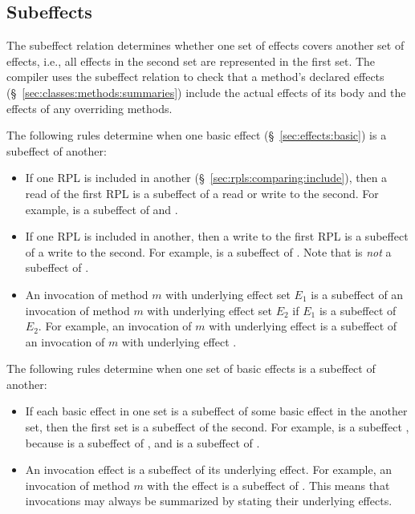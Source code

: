 \subsection{Subeffects%
\label{sec:effects:subeffects}}

The subeffect relation determines whether one set of effects covers
another set of effects, i.e., all effects in the second set are
represented in the first set.  The compiler uses the subeffect
relation to check that a method's declared effects
(\S~\ref{sec:classes:methods:summaries}) include the actual effects of
its body and the effects of any overriding methods.

  The following rules determine when one basic
effect (\S~\ref{sec:effects:basic}) is a subeffect of another:
%
\begin{itemize}
%
\item If one RPL is included in another
  (\S~\ref{sec:rpls:comparing:include}), then a read of the first RPL
  is a subeffect of a read or write to the second.  For example,
   is a subeffect of  and
  .
%
\item If one RPL is included in another, then a write to the first RPL
  is a subeffect of a write to the second.  For example,  is a subeffect of .  Note that
   is \emph{not} a subeffect of .
%
\item An invocation of method $m$ with underlying effect set $E_1$ is
  a subeffect of an invocation of method $m$ with underlying effect
  set $E_2$ if $E_1$ is a subeffect of $E_2$.  For example, an
  invocation of $m$ with underlying effect  is a
  subeffect of an invocation of $m$ with underlying effect .
%
\end{itemize}

  The following rules determine when one set of
basic effects is a subeffect of another:
%
\begin{itemize}
%
\item If each basic effect in one set is a subeffect of some basic
  effect in the another set, then the first set is a subeffect of the
  second.  For example,  is a subeffect
  , because  is a subeffect of
  , and  is a subeffect of .
%
\item An invocation effect is a subeffect of its underlying effect.
  For example, an invocation of method $m$ with the effect  is a subeffect of .  This means that invocations
  may always be summarized by stating their underlying effects.
%
\end{itemize}

